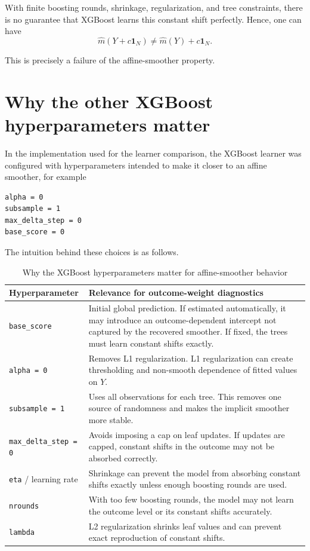 \documentclass[11pt,a4paper]{article}
\begin{document}
With finite boosting rounds, shrinkage, regularization, and tree constraints,
there is no guarantee that XGBoost learns this constant shift perfectly. Hence,
one can have
\begin{equation}
    \hat m(Y+c\mathbf{1}_N)
    \neq
    \hat m(Y)+c\mathbf{1}_N.
\end{equation}

This is precisely a failure of the affine-smoother property.

\section{Why the other XGBoost hyperparameters matter}

In the implementation used for the learner comparison, the XGBoost learner was
configured with hyperparameters intended to make it closer to an affine smoother,
for example
\begin{verbatim}
alpha = 0
subsample = 1
max_delta_step = 0
base_score = 0
\end{verbatim}

The intuition behind these choices is as follows.

\begin{table}[h!]
\centering
\caption{Why the XGBoost hyperparameters matter for affine-smoother behavior}
\begin{tabular}{p{}p{}}
\toprule
Hyperparameter & Relevance for outcome-weight diagnostics \\
\midrule
\texttt{base\_score} &
Initial global prediction. If estimated automatically, it may introduce an
outcome-dependent intercept not captured by the recovered smoother. If fixed,
the trees must learn constant shifts exactly. \\
\addlinespace
\texttt{alpha = 0} &
Removes L1 regularization. L1 regularization can create thresholding and
non-smooth dependence of fitted values on \(Y\). \\
\addlinespace
\texttt{subsample = 1} &
Uses all observations for each tree. This removes one source of randomness and
makes the implicit smoother more stable. \\
\addlinespace
\texttt{max\_delta\_step = 0} &
Avoids imposing a cap on leaf updates. If updates are capped, constant shifts in
the outcome may not be absorbed correctly. \\
\addlinespace
\texttt{eta} / learning rate &
Shrinkage can prevent the model from absorbing constant shifts exactly unless
enough boosting rounds are used. \\
\addlinespace
\texttt{nrounds} &
With too few boosting rounds, the model may not learn the outcome level or its
constant shifts accurately. \\
\addlinespace
\texttt{lambda} &
L2 regularization shrinks leaf values and can prevent exact reproduction of
constant shifts. \\
\bottomrule
\end{tabular}
\end{table}
\end{document}

